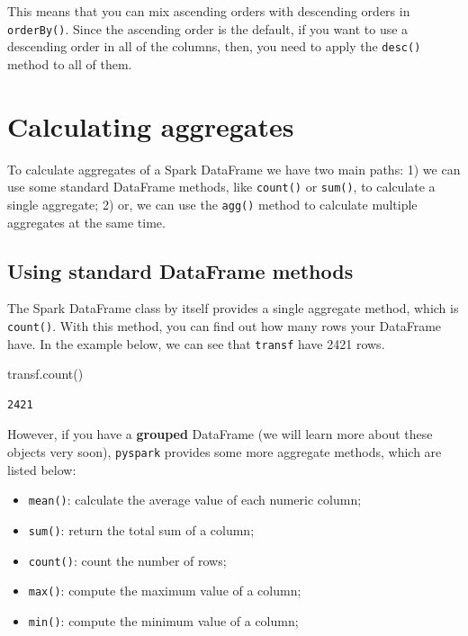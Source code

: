 \documentclass[
  11pt,
  letterpaper,
  DIV=11,
  numbers=noendperiod]{scrreprt}
\newenvironment{Shaded}{\begin{snugshade}}{\end{snugshade}}
\newcommand{\NormalTok}[1]{\textcolor[rgb]{0.00,0.23,0.31}{#1}}
\providecommand{\tightlist}{%
  \setlength{\itemsep}{0pt}\setlength{\parskip}{0pt}}\usepackage{longtable,booktabs,array}
\begin{document}
This means that you can mix ascending orders with descending orders in
\texttt{orderBy()}. Since the ascending order is the default, if you
want to use a descending order in all of the columns, then, you need to
apply the \texttt{desc()} method to all of them.

\hypertarget{calculating-aggregates}{%
\section{Calculating aggregates}\label{calculating-aggregates}}

To calculate aggregates of a Spark DataFrame we have two main paths: 1)
we can use some standard DataFrame methods, like \texttt{count()} or
\texttt{sum()}, to calculate a single aggregate; 2) or, we can use the
\texttt{agg()} method to calculate multiple aggregates at the same time.

\hypertarget{using-standard-dataframe-methods}{%
\subsection{Using standard DataFrame
methods}\label{using-standard-dataframe-methods}}

The Spark DataFrame class by itself provides a single aggregate method,
which is \texttt{count()}. With this method, you can find out how many
rows your DataFrame have. In the example below, we can see that
\texttt{transf} have 2421 rows.

\begin{Shaded}
\begin{Highlighting}[]
\NormalTok{transf.count()}
\end{Highlighting}
\end{Shaded}

\begin{verbatim}
2421
\end{verbatim}

However, if you have a \textbf{grouped} DataFrame (we will learn more
about these objects very soon), \texttt{pyspark} provides some more
aggregate methods, which are listed below:

\begin{itemize}
\tightlist
\item
  \texttt{mean()}: calculate the average value of each numeric column;
\item
  \texttt{sum()}: return the total sum of a column;
\item
  \texttt{count()}: count the number of rows;
\item
  \texttt{max()}: compute the maximum value of a column;
\item
  \texttt{min()}: compute the minimum value of a column;
\end{itemize}
\end{document}
